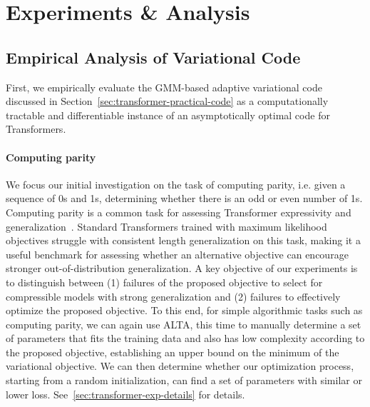 \section{Experiments \& Analysis}
\label{sec:experiments}


\subsection{Empirical Analysis of Variational Code}
\label{sec:variational-code-experiments}

First, we empirically evaluate the GMM-based adaptive variational code discussed in Section~\ref{sec:transformer-practical-code} as a computationally tractable and differentiable instance of an asymptotically optimal code for Transformers.

\paragraph{Computing parity} We focus our initial investigation on the task of computing parity, i.e. given a sequence of 0s and 1s, determining whether there is an odd or even number of 1s. Computing parity is a common task for assessing Transformer expressivity and generalization~\citep{hahn2020theoretical,bhattamishra2020ability,chiang2022overcoming,ruoss2023randomized,deletang2022neural,anil2022exploring,zhou2022teaching,zhou2023algorithms}. Standard Transformers trained with maximum likelihood objectives struggle with consistent length generalization on this task, making it a useful benchmark for assessing whether an alternative objective can encourage stronger out-of-distribution generalization. 
A key objective of our experiments is to distinguish between (1) failures of the proposed objective to select for compressible models with strong generalization and (2) failures to effectively optimize the proposed objective. To this end, for simple algorithmic tasks such as computing parity, we can again use ALTA, this time to manually determine a set of parameters that fits the training data and also has low complexity according to the proposed objective, establishing an upper bound on the minimum of the variational objective. We can then determine whether our optimization process, starting from a random initialization, can find a set of parameters with similar or lower loss. See~\ref{sec:transformer-exp-details} for details.


